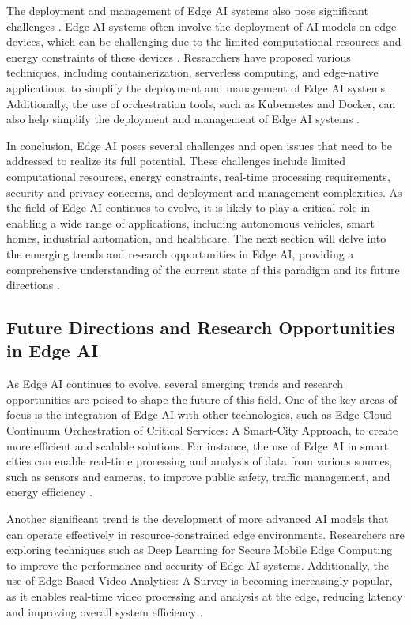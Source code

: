 \documentclass[11pt,a4paper]{article}
\begin{document}
The deployment and management of Edge AI systems also pose significant challenges \cite{arxiv:2108.08059}. Edge AI systems often involve the deployment of AI models on edge devices, which can be challenging due to the limited computational resources and energy constraints of these devices \cite{arxiv:2412.01412}. Researchers have proposed various techniques, including containerization, serverless computing, and edge-native applications, to simplify the deployment and management of Edge AI systems \cite{arxiv:2002.03805}. Additionally, the use of orchestration tools, such as Kubernetes and Docker, can also help simplify the deployment and management of Edge AI systems \cite{arxiv:2503.04815}.

In conclusion, Edge AI poses several challenges and open issues that need to be addressed to realize its full potential. These challenges include limited computational resources, energy constraints, real-time processing requirements, security and privacy concerns, and deployment and management complexities. As the field of Edge AI continues to evolve, it is likely to play a critical role in enabling a wide range of applications, including autonomous vehicles, smart homes, industrial automation, and healthcare. The next section will delve into the emerging trends and research opportunities in Edge AI, providing a comprehensive understanding of the current state of this paradigm and its future directions \cite{arxiv:2407.05963}.


\subsection{Future Directions and Research Opportunities in Edge AI}


As Edge AI continues to evolve, several emerging trends and research opportunities are poised to shape the future of this field. One of the key areas of focus is the integration of Edge AI with other technologies, such as Edge-Cloud Continuum Orchestration of Critical Services: A Smart-City Approach, to create more efficient and scalable solutions. For instance, the use of Edge AI in smart cities can enable real-time processing and analysis of data from various sources, such as sensors and cameras, to improve public safety, traffic management, and energy efficiency \cite{arxiv:1909.08747}.

Another significant trend is the development of more advanced AI models that can operate effectively in resource-constrained edge environments. Researchers are exploring techniques such as Deep Learning for Secure Mobile Edge Computing to improve the performance and security of Edge AI systems. Additionally, the use of Edge-Based Video Analytics: A Survey is becoming increasingly popular, as it enables real-time video processing and analysis at the edge, reducing latency and improving overall system efficiency \cite{arxiv:2303.14329}.
\end{document}
